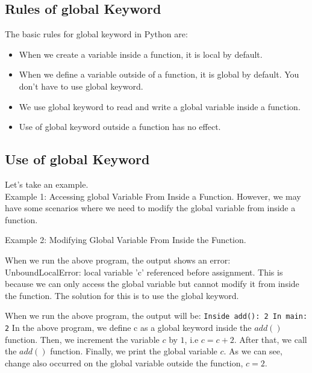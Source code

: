 \subsection{Rules of global Keyword}
The basic rules for global keyword in Python are:
\begin{itemize}
    \item When we create a variable inside a function, it is local by default.
    \item When we define a variable outside of a function, it is global by default. You don't have to use global keyword.
    \item We use global keyword to read and write a global variable inside a function.
    \item Use of global keyword outside a function has no effect.
\end{itemize}

\subsection{Use of global Keyword}
Let's take an example.\\
\noindent Example 1: Accessing global Variable From Inside a Function. However, we may have some scenarios where we need to modify the global variable from inside a function.

\noindent\begin{minipage}{\linewidth}

\end{minipage}


\noindent Example 2: Modifying Global Variable From Inside the Function.\\

\noindent\begin{minipage}{\linewidth}

\end{minipage}

\noindent When we run the above program, the output shows an error: UnboundLocalError: local variable 'c' referenced before assignment. This is because we can only access the global variable but cannot modify it from inside the function. The solution for this is to use the global keyword.\\

\noindent\begin{minipage}{\linewidth}

\end{minipage}

When we run the above program, the output will be:
\texttt{Inside add(): 2  In main: 2}
In the above program, we define c as a global keyword inside the $add()$ function. Then, we increment the variable $c$ by $1$, i.e $c = c + 2$. After that, we call the $add()$ function. Finally, we print the global variable $c$. As we can see, change also occurred on the global variable outside the function, $c = 2$.

